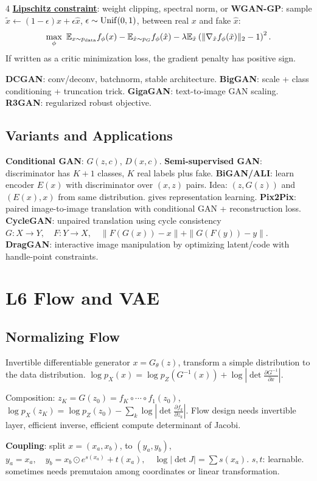 \documentclass{article}
\newcommand{\key}[1]{\textbf{#1}}
\newcommand{\lowterm}[1]{\textbf{\underline{#1}}}
\newcommand{\E}{\mathbb{E}}
\newcommand{\1}{\mathbf 1}
\begin{document}
\begin{multicols*}{4}
\lowterm{Lipschitz constraint}: weight clipping, spectral norm, or \key{WGAN-GP}: sample $\tilde{x}\gets (1-\epsilon)x+\epsilon\hat{x}$, $\epsilon\sim {\rm Unif}(0,1)$, between real $x$ and fake $\hat x$:
\[
\max_\phi\ \E_{x\sim p_{\rm data}}f_\phi(x)-\E_{\hat x\sim p_G}f_\phi(\hat x)
-\lambda\E_{\tilde x}\left(\|\nabla_{\tilde x}f_\phi(\tilde x)\|_2-1\right)^2.
\]
If written as a critic minimization loss, the gradient penalty has positive sign.

\key{DCGAN}: conv/deconv, batchnorm, stable architecture. \key{BigGAN}: scale + class conditioning + truncation trick. \key{GigaGAN}: text-to-image GAN scaling. \key{R3GAN}: regularized robust objective.

\subsection{Variants and Applications}
\key{Conditional GAN}: $G(z,c)$, $D(x,c)$. \key{Semi-supervised GAN}: discriminator has $K+1$ classes, $K$ real labels plus fake. \key{BiGAN/ALI}: learn encoder $E(x)$ with discriminator over $(x,z)$ pairs. Idea: $(z,G(z))$ and $(E(x),x)$ from same distribution. gives representation learning. \key{Pix2Pix}: paired image-to-image translation with conditional GAN + reconstruction loss. \key{CycleGAN}: unpaired translation using cycle consistency
\(
G:X\to Y,\quad F:Y\to X,\quad \|F(G(x))-x\|+\|G(F(y))-y\|.
\)
\key{DragGAN}: interactive image manipulation by optimizing latent/code with handle-point constraints.

\section{L6 Flow and VAE}
\subsection{Normalizing Flow}
Invertible differentiable generator $x=G_\theta(z)$,  transform a simple distribution to the data distribution. 
\(
\log p_X(x)=\log p_Z(G^{-1}(x))+\log\left|\det\frac{\partial G^{-1}}{\partial x}\right|.
\)

Composition: $z_K=G(z_0)=f_K\circ\cdots\circ f_1(z_0)$, 
$\log p_X(z_K)=\log p_Z(z_0)-\sum_k \log |\det \frac{\partial f_k}{\partial z_k}|$. 
Flow design needs invertible layer, efficient inverse, efficient compute determinant of Jacobi. 

\key{Coupling}: split $x=(x_a,x_b)$, to $(y_a,y_b)$, 
\(
y_a=x_a,\quad y_b=x_b\odot e^{s(x_a)}+t(x_a),\quad
\log|\det J|=\sum s(x_a). 
\)
$s,t$: learnable. sometimes needs premutaion among coordinates or linear transformation.  


\end{multicols*}
\end{document}
